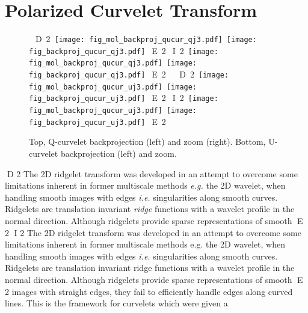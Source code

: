 \section{Polarized Curvelet Transform}
\label{sec:pol_cur}
 \begin{figure*}[htb]
\centerline{
\vbox{
 \hbox{
D 2
 \texttt{[image: fig\_mol\_backproj\_qucur\_qj3.pdf]}
 \texttt{[image: fig\_backproj\_qucur\_qj3.pdf]}
E 2
I 2
 \texttt{[image: fig\_mol\_backproj\_qucur\_qj3.pdf]}
 \texttt{[image: fig\_backproj\_qucur\_qj3.pdf]}
E 2
 }
 \hbox{
D 2
 \texttt{[image: fig\_mol\_backproj\_qucur\_uj3.pdf]}
 \texttt{[image: fig\_backproj\_qucur\_uj3.pdf]}
E 2
I 2
 \texttt{[image: fig\_mol\_backproj\_qucur\_uj3.pdf]}
 \texttt{[image: fig\_backproj\_qucur\_uj3.pdf]}
E 2
 }
 }
 }
\caption{Top, Q-curvelet backprojection (left)  and zoom (right). Bottom, U-curvelet backprojection (left)  and zoom. }
\label{fig_qucur_back}
\end{figure*}
D 2
The 2D ridgelet transform \cite{cur:candes99_1} was developed in an attempt to overcome some limitations inherent in former multiscale methods 
\emph{e.g.} the 2D wavelet, when handling smooth images with edges \textit{i.e.} singularities along smooth curves. Ridgelets are translation 
invariant \emph{ridge} functions with a wavelet profile in the normal direction. Although ridgelets provide sparse representations of smooth 
E 2
I 2
The 2D ridgelet transform \citep{cur:candes99_1} was developed in an attempt to overcome some limitations inherent in former multiscale methods 
e.g. the 2D wavelet, when handling smooth images with edges \textit{i.e.} singularities along smooth curves. Ridgelets are translation 
invariant ridge functions with a wavelet profile in the normal direction. Although ridgelets provide sparse representations of smooth 
E 2
images with straight edges, they fail to efficiently handle edges along curved lines. This is the framework for curvelets which were given a 
